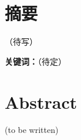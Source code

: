 \section*{摘\quad 要}
（待写）

\noindent\textbf{关键词：}（待定）
\clearpage
\section*{Abstract}
(to be written)
